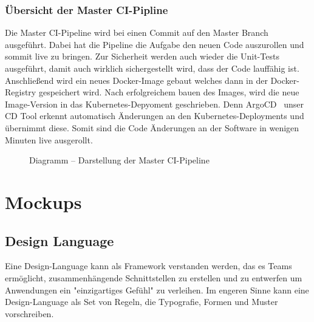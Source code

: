 \subsubsection{Übersicht der Master \ac{CI}-Pipline}
Die Master \ac{CI}-Pipeline wird bei einen Commit auf den Master Branch ausgeführt. Dabei hat die Pipeline die Aufgabe den neuen Code auszurollen und sommit live zu bringen.
Zur Sicherheit werden auch wieder die Unit-Tests ausgeführt, damit auch wirklich sichergestellt wird, dass der Code lauffähig ist. Anschließend wird ein neues Docker-Image gebaut
welches dann in der Docker-Registry gespeichert wird. Nach erfolgreichem bauen des Images, wird die neue Image-Version in das Kubernetes-Depyoment geschrieben. Denn ArgoCD~\parencite{web/argocd} unser \ac{CD} Tool
erkennt automatisch Änderungen an den Kubernetes-Deployments und übernimmt diese. Somit sind die Code Änderungen an der Software in wenigen Minuten live ausgerollt.
\begin{figure}[!htbp]
    \centering    
    \usetikzlibrary{positioning}
\caption{Diagramm – Darstellung der Master \ac{CI}-Pipeline}
\end{figure}

\section{Mockups}
\subsection{Design Language}
Eine Design-Language kann als Framework verstanden werden, das es Teams ermöglicht, 
zusammenhängende Schnittstellen zu erstellen und zu entwerfen um Anwendungen ein "einzigartiges Gefühl" zu verleihen.
Im engeren Sinne kann eine Design-Language als Set von Regeln, die Typografie, Formen und Muster vorschreiben.

